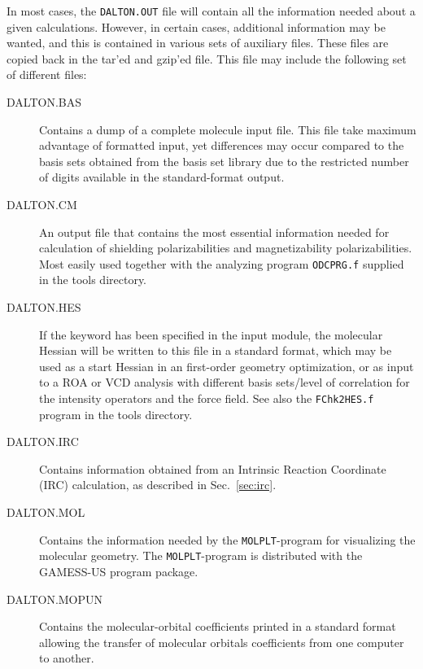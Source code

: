 In most cases, the \verb|DALTON.OUT| file will contain all the
information needed about a given calculations. However, in certain
cases, additional information may be wanted, and this is contained
in various sets of auxiliary files. These files are copied back in the
tar'ed and gzip'ed file. This file may include the following set of
different files:

\begin{description}
\item[DALTON.BAS] Contains a dump of a complete molecule input file.
 This file take maximum
advantage of formatted input, yet differences may occur compared to
the basis sets obtained from the basis set library due to the
restricted number of digits available in the standard-format output.

\item[DALTON.CM] An output file that contains the most essential
information needed for calculation of shielding polarizabilities
and magnetizability polarizabilities. Most easily used together
with the analyzing program \verb|ODCPRG.f| supplied in
the
tools directory.

\item[DALTON.HES] If the keyword  has been specified in
the  input module, the molecular Hessian
will be written
to this file in a standard format, which may be used as a start Hessian
in an first-order geometry
optimization, or as input to a ROA  or
VCD
analysis with different basis sets/level of correlation for the
intensity operators and the force field. See also the
\verb|FChk2HES.f| program in the tools directory.

\item[DALTON.IRC] Contains information obtained from an Intrinsic
Reaction Coordinate (IRC) calculation, as described in
Sec.~\ref{sec:irc}.

\item[DALTON.MOL] Contains the information needed by the
\verb|MOLPLT|-program for visualizing the molecular geometry. The
\verb|MOLPLT|-program is distributed with the GAMESS-US program
package.

\item[DALTON.MOPUN] Contains the molecular-orbital coefficients
printed in a standard format allowing the transfer of molecular
orbitals coefficients from one computer to another.


\end{description}
